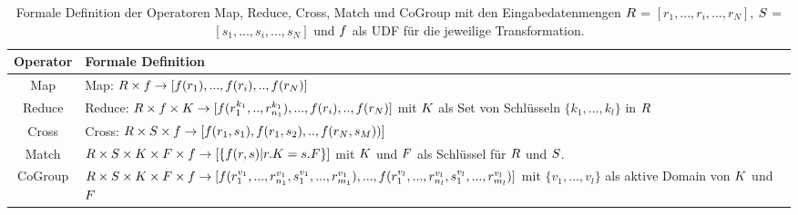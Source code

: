 \begin{table}[position specifier]
          \centering
          \begin{tabular}{| c | C{12cm} |}
          	\hline
                  Operator & Formale Definition \\
                  \hline
                  Map & Map: \(\mathnormal{R} \times \mathnormal{f} \rightarrow [\mathnormal{f}(r_1),...,\mathnormal{f}(r_i),..,\mathnormal{f}(r_N)] \) \\
               
                  \hline
		Reduce & Reduce: \(\mathnormal{R} \times \mathnormal{f} \times \mathnormal{K} \rightarrow  [\mathnormal{f}(r_1^{k_1},..,r_{n_1}^{k_1}),...,\mathnormal{f}(r_i),..,\mathnormal{f}(r_N)] \) \newline mit \(\mathnormal{K}\) als Set von Schlüsseln \(\{k_1,...,k_l\} \) in \(\mathnormal{R}\) \\
                  \hline
                  Cross & Cross: \(\mathnormal{R} \times \mathnormal{S} \times \mathnormal{f} \rightarrow [\mathnormal{f}(r_1, s_1),\mathnormal{f}(r_1, s_2),..,\mathnormal{f}(r_N, s_M))] \) \\
                  \hline
                  Match & \(\mathnormal{R} \times \mathnormal{S} \times \mathnormal{K} \times \mathnormal{F} \times \mathnormal{f} \rightarrow [\{\mathnormal{f}(r, s)| r.K = s.F \}] \) \newline mit \(\mathnormal{K} \) und \(\mathnormal{F} \) als Schlüssel für \(\mathnormal{R} \) und \(\mathnormal{S} \). \\
                  \hline
                  CoGroup & \(\mathnormal{R} \times \mathnormal{S} \times \mathnormal{K} \times \mathnormal{F} \times \mathnormal{f} \rightarrow [\mathnormal{f}(r^{v_1}_1,...,r^{v_1}_{n_1},s^{v_1}_1,...,r^{v_1}_{m_1}),...,\mathnormal{f}(r^{v_l}_1,...,r^{v_l}_{n_l},s^{v_l}_1,...,r^{v_l}_{m_l})] \) \newline mit \(\{v_1,...,v_l\}\) als aktive Domain von \( \mathnormal{K}\) und \( \mathnormal{F}\) \\
                  \hline
          \end{tabular}
          \caption{Formale Definition der Operatoren Map, Reduce, Cross, Match und CoGroup mit den Eingabedatenmengen \(\mathnormal{R}\) = \([r_1,...,r_i,...,r_N]\), \(\mathnormal{S}\) = \([s_1,...,s_i,...,s_N]\) und \(\mathnormal{f}\) als UDF für die jeweilige Transformation. \cite{Hueske2012}}
          \label{tab:flinkOperatorsDefinition}
\end{table}

